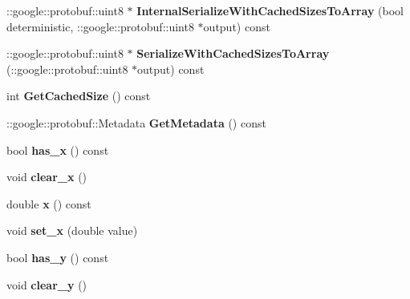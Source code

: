 \begin{DoxyCompactItemize}
\+::google\+::protobuf\+::uint8 $\ast$ {\bfseries Internal\+Serialize\+With\+Cached\+Sizes\+To\+Array} (bool deterministic, \+::google\+::protobuf\+::uint8 $\ast$output) const
\item 
\hypertarget{classstruct_definitions_1_1_point3_d_a4b6fc534cc491bac685982e304a69a28}{}\label{classstruct_definitions_1_1_point3_d_a4b6fc534cc491bac685982e304a69a28} 
\+::google\+::protobuf\+::uint8 $\ast$ {\bfseries Serialize\+With\+Cached\+Sizes\+To\+Array} (\+::google\+::protobuf\+::uint8 $\ast$output) const
\item 
\hypertarget{classstruct_definitions_1_1_point3_d_a4a19889af38f736ba9f52ec52966b334}{}\label{classstruct_definitions_1_1_point3_d_a4a19889af38f736ba9f52ec52966b334} 
int {\bfseries Get\+Cached\+Size} () const
\item 
\hypertarget{classstruct_definitions_1_1_point3_d_a7ac88a4e1c1465d1c060c617bdb28112}{}\label{classstruct_definitions_1_1_point3_d_a7ac88a4e1c1465d1c060c617bdb28112} 
\+::google\+::protobuf\+::\+Metadata {\bfseries Get\+Metadata} () const
\item 
\hypertarget{classstruct_definitions_1_1_point3_d_ac82bb131ddebae24a4b07904114252c8}{}\label{classstruct_definitions_1_1_point3_d_ac82bb131ddebae24a4b07904114252c8} 
bool {\bfseries has\+\_\+x} () const
\item 
\hypertarget{classstruct_definitions_1_1_point3_d_adba2d16e41720fd7214807df4acdcfe5}{}\label{classstruct_definitions_1_1_point3_d_adba2d16e41720fd7214807df4acdcfe5} 
void {\bfseries clear\+\_\+x} ()
\item 
\hypertarget{classstruct_definitions_1_1_point3_d_aa2c65a74cd2605f2f46cd7fa88ed537c}{}\label{classstruct_definitions_1_1_point3_d_aa2c65a74cd2605f2f46cd7fa88ed537c} 
double {\bfseries x} () const
\item 
\hypertarget{classstruct_definitions_1_1_point3_d_a4f2bd04e8f2530367b7f17b67ab0c428}{}\label{classstruct_definitions_1_1_point3_d_a4f2bd04e8f2530367b7f17b67ab0c428} 
void {\bfseries set\+\_\+x} (double value)
\item 
\hypertarget{classstruct_definitions_1_1_point3_d_a71d5cf88fa2b8297dafb1c7dddc90d5f}{}\label{classstruct_definitions_1_1_point3_d_a71d5cf88fa2b8297dafb1c7dddc90d5f} 
bool {\bfseries has\+\_\+y} () const
\item 
\hypertarget{classstruct_definitions_1_1_point3_d_a9baf5d107a3533b00e48289f426a43ea}{}\label{classstruct_definitions_1_1_point3_d_a9baf5d107a3533b00e48289f426a43ea} 
void {\bfseries clear\+\_\+y} ()
\item 

\end{DoxyCompactItemize}
